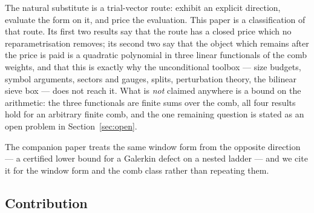 \documentclass[11pt,a4paper]{article}
\theoremstyle{plain}
\theoremstyle{definition}
\begin{document}
The natural substitute is a trial-vector route: exhibit an explicit direction,
evaluate the form on it, and price the evaluation. This paper is a
classification of that route. Its first two results say that the route has a
closed price which no reparametrisation removes; its second two say that the
object which remains after the price is paid is a quadratic polynomial in three
linear functionals of the comb weights, and that this is exactly why the
unconditional toolbox --- size budgets, symbol arguments, sectors and gauges,
splits, perturbation theory, the bilinear sieve box --- does not reach it. What
is \emph{not} claimed anywhere is a bound on the arithmetic: the three
functionals are finite sums over the comb, all four results hold for an
arbitrary finite comb, and the one remaining question is stated as an open
problem in Section~\ref{sec:open}.

The companion paper \cite{PaperI} treats the same window form from the opposite
direction --- a certified lower bound for a Galerkin defect on a nested ladder
--- and we cite it for the window form and the comb class rather than repeating
them.

\subsection{Contribution}
\label{sec:contrib}
\end{document}
